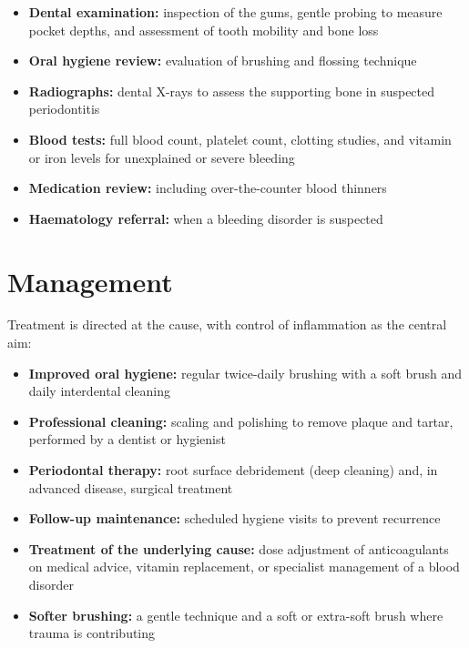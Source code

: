 \begin{itemize}
    \item \textbf{Dental examination:} inspection of the gums, gentle probing to measure pocket depths, and assessment of tooth mobility and bone loss
    \item \textbf{Oral hygiene review:} evaluation of brushing and flossing technique
    \item \textbf{Radiographs:} dental X-rays to assess the supporting bone in suspected periodontitis
    \item \textbf{Blood tests:} full blood count, platelet count, clotting studies, and vitamin or iron levels for unexplained or severe bleeding
    \item \textbf{Medication review:} including over-the-counter blood thinners
    \item \textbf{Haematology referral:} when a bleeding disorder is suspected
\end{itemize}

\section*{Management}
Treatment is directed at the cause, with control of inflammation as the central aim:

\begin{itemize}
    \item \textbf{Improved oral hygiene:} regular twice-daily brushing with a soft brush and daily interdental cleaning
    \item \textbf{Professional cleaning:} scaling and polishing to remove plaque and tartar, performed by a dentist or hygienist
    \item \textbf{Periodontal therapy:} root surface debridement (deep cleaning) and, in advanced disease, surgical treatment
    \item \textbf{Follow-up maintenance:} scheduled hygiene visits to prevent recurrence
    \item \textbf{Treatment of the underlying cause:} dose adjustment of anticoagulants on medical advice, vitamin replacement, or specialist management of a blood disorder
    \item \textbf{Softer brushing:} a gentle technique and a soft or extra-soft brush where trauma is contributing
\end{itemize}

